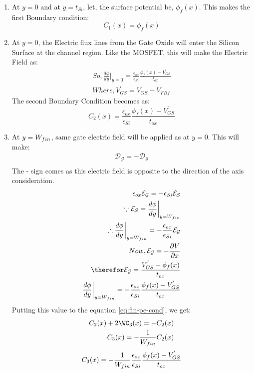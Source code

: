 \documentclass[a4paper]{article}
\begin{document}
\begin{enumerate}
\item At $y=0$ and at $y=t_{Si}$, let, the surface potential be, $\phi_f(x)$. This makes the first Boundary condition:
  \begin{equation}
    \label{eq:fin-cond-1}
    C_1(x)=\phi_f(x)
  \end{equation}
\item At $y=0$, the Electric flux lines from the Gate Oxide will enter the Silicon Surface at the channel region. Like the MOSFET, this will make the Electric Field as:
  \begin{align*}
    So, \frac{d\phi}{dy} \bigg\vert_{y=0} = \frac {\epsilon_{ox}} {\epsilon_{Si}} \frac{\phi_f(x) - V_{GS}^{'}}{t_{ox}}\\
    Where, V_{GS}^{'} = V_{GS} - V_{FBf}
  \end{align*}
  The second Boundary Condition becomes as:
  \begin{equation}
    \label{eq:fin-cond-2}
    C_2(x)=\frac {\epsilon_{ox}} {\epsilon_{Si}} \frac{\phi_f(x) - V_{GS}^{'}}{t_{ox}}
  \end{equation}
\item At $y=W_{fin}$, same gate electric field will be applied as at $y=0$. This will make:
  \begin{align*}
    \mathcal{D_{G}} = - \mathcal{D_{S}}\\
  \end{align*}
  The - sign comes as this electric field is opposite to the direction of the axis consideration.
  \begin{align*}
    \epsilon_{ox} \mathcal{E_{G}} = - \epsilon_{Si} \mathcal{E_{S}}\\
    \because \mathcal{E_{S}} = \frac{d\phi}{dy} \bigg\vert_{y=\W}\\
    \therefore \frac{d\phi}{dy} \bigg\vert_{y=\W} = - \frac {\epsilon_{ox}} {\epsilon_{Si}} \mathcal{E_{G}}\\
    Now, \mathcal{E_{G}} = - \frac{\partial V}{\partial x}\\
    \therefor \mathcal{E_{G}} = \frac{V_{GS}^{'} - \phi_f(x)}{t_{ox}}\\
    \frac{d\phi}{dy} \bigg\vert_{y=\W} = - \frac {\epsilon_{ox}} {\epsilon_{Si}} \frac{\phi_f(x) - V_{GS}^{'}}{t_{ox}}
  \end{align*}
  Putting this value to the equation \ref{eq:fin-pe-cond}, we get:
  \begin{align*}
    C_2(x) + 2\WC_3(x)= - C_2(x)\\
    C_3(x) = - \frac{1}{\W} C_2(x)
  \end{align*}
  \begin{equation}
    \label{eq:fin-cond-3}
    C_3(x) = - \frac{1}{W_{fin}} \frac {\epsilon_{ox}} {\epsilon_{Si}} \frac{\phi_f(x) - V_{GS}^{'}}{t_{ox}}
  \end{equation}
\end{enumerate}
\end{document}
